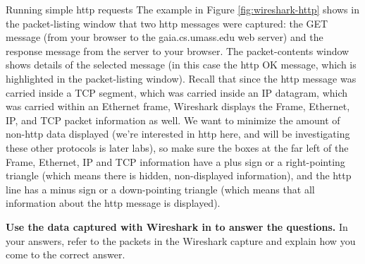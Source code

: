 \begin{exercise}{Running simple \ac{http} requests}
The example in Figure \ref{fig:wireshark-http} shows in the packet-listing window that two \ac{http} messages were captured: the GET message (from your browser to the gaia.cs.umass.edu web server) and the response message from the server to your browser. The packet-contents window shows details of the selected message (in this case the \ac{http} OK message, which is highlighted in the packet-listing window). Recall that since the \ac{http} message was carried inside a TCP segment, which was carried inside an IP datagram, which was carried within an Ethernet frame, Wireshark displays the Frame, Ethernet, IP, and TCP packet information as well. We want to minimize the amount of non-\ac{http} data displayed (we’re interested in \ac{http} here, and will be investigating these other protocols is later labs), so make sure the boxes at the far left of the Frame, Ethernet, IP and TCP information have a plus sign or a right-pointing triangle (which means there is hidden, non-displayed information), and the \ac{http} line has a minus sign or a down-pointing triangle (which means that all information about the \ac{http} message is displayed). 

\textbf{Use the data captured with Wireshark in  to answer the questions.} In your answers, refer to the packets in the Wireshark capture and explain how you come to the correct answer.

\end{exercise}


